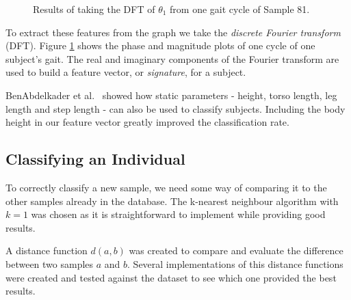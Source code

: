 \documentclass[a4paper,12pt]{article}
\begin{document}
\begin{figure}[p]
	\centering
	\quad
	\caption{Results of taking the DFT of $\theta_1$ from one gait cycle of Sample 81.}
	\label{FFTResults}
\end{figure}

To extract these features from the graph we take the \emph{discrete Fourier transform} (DFT).
Figure \ref{FFTResults} shows the phase and magnitude plots of one cycle of one subject's gait.
The real and imaginary components of the Fourier transform are used to build a feature vector, or \emph{signature}, for a subject.

BenAbdelkader et al.\ \cite{StrideCadence} showed how static parameters - height, torso length, leg length and step length - can also be used to classify subjects.
Including the body height in our feature vector greatly improved the classification rate.

\subsection{Classifying an Individual}

To correctly classify a new sample, we need some way of comparing it to the other samples already in the database.
The k-nearest neighbour algorithm with $k=1$ was chosen as it is straightforward to implement while providing good results.

A distance function $d(a,b)$ was created to compare and evaluate the difference between two samples $a$ and $b$.
Several implementations of this distance functions were created and tested against the dataset to see which one provided the best results.
\end{document}
